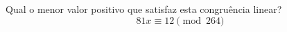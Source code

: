 Qual o menor valor positivo que satisfaz esta congruência linear?
\begin{displaymath}
	81x \equiv 12 \pmod{264}
\end{displaymath}
